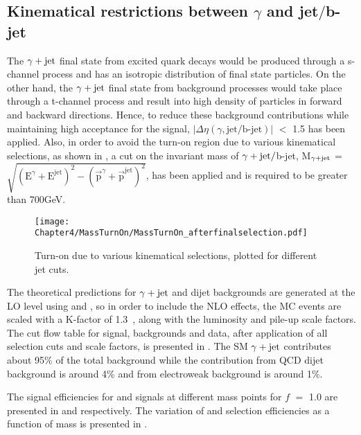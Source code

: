 \subsection{Kinematical restrictions between $\gamma$ and jet$/$b-jet}
The $\gamma+\mathrm{jet}$ final state from excited quark decays would be produced through a s-channel process and has an isotropic distribution of final state particles.
On the other hand, the $\gamma+\mathrm{jet}$ final state from background processes would take place through a t-channel process and result into high density of particles
in forward and backward directions. Hence, to reduce these background contributions while maintaining high acceptance for the signal, 
$|\Delta\eta(\gamma, \textrm{jet}/\textrm{b-jet})|$ $<$ 1.5 has been applied. Also, in order to avoid the turn-on region due to various kinematical selections,
as shown in \fig{\ref{fig:MassTurnOn}}, a cut on the invariant mass of $\gamma+\mathrm{jet}/$b-jet,
M$_{\gamma+\mathrm{jet}}$ = $\sqrt{(\textrm{E}^{\gamma} + \textrm{E}^{\textrm{jet}})^{2} - (\vec{\textrm{p}}^{\gamma} + \vec{\textrm{p}}^{\textrm{jet}})^{2}}$,
has been applied and is required to be greater than 700\unit{GeV}.

\begin{figure}[h!]
\centering
\texttt{[image: Chapter4/MassTurnOn/MassTurnOn\_afterfinalselection.pdf]}
\caption{Turn-on due to various kinematical selections, plotted for different jet \pt cuts.}
\label{fig:MassTurnOn}
\end{figure}

The theoretical predictions for $\gamma+\mathrm{jet}$ and dijet backgrounds are generated at the LO level using \pythia and \madgraph, so in order to include the NLO effects,
the MC events are scaled with a K-factor of 1.3~\cite{dijetkfactor1, dijetkfactor2}, along with the luminosity and pile-up scale factors.
The cut flow table for signal, backgrounds and data, after application of all selection cuts and scale factors, is presented in \tab{\ref{Table:SelCutFlow}}.
The SM $\gamma+\mathrm{jet}$ contributes about 95$\%$ of the total background while the contribution from
QCD dijet background is around 4$\%$ and from electroweak background is around 1$\%$. 



The signal efficiencies for \qstar and \bstar signals at different mass points for $f$ $=$ 1.0 are presented in \tab{\ref{Table:SelEff_Qstarf1p0}} and
\tab{\ref{Table:SelEff_Bstarf1p0}} respectively. 
The variation of \qstar and \bstar selection efficiencies as a function of mass is presented in \fig{\ref{fig:accEff}}. 
\vspace{0.2in}

